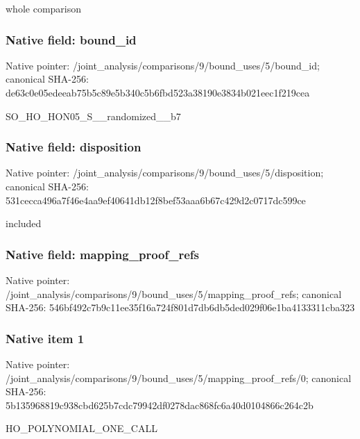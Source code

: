 \documentclass[10pt,a4paper]{article}
\begin{document}
\begingroup\raggedright\sloppy whole comparison\par\endgroup

\subsubsection{Native field: bound\_\allowbreak{}id}
Native pointer: /joint\_\allowbreak{}analysis/comparisons/9/bound\_\allowbreak{}uses/5/bound\_\allowbreak{}id; canonical SHA-256: de63c0e05edeeab75b5c89e5b340c5b6fbd523a38190e3834b021eec1f219cea

\begingroup\raggedright\sloppy SO\_\allowbreak{}HO\_\allowbreak{}HON05\_\allowbreak{}S\_\allowbreak{}\_\allowbreak{}randomized\_\allowbreak{}\_\allowbreak{}b7\par\endgroup

\subsubsection{Native field: disposition}
Native pointer: /joint\_\allowbreak{}analysis/comparisons/9/bound\_\allowbreak{}uses/5/disposition; canonical SHA-256: 531cecca496a7f46e4aa9ef40641db12f8bef53aaa6b67c429d2c0717dc599ce

\begingroup\raggedright\sloppy included\par\endgroup

\subsubsection{Native field: mapping\_\allowbreak{}proof\_\allowbreak{}refs}
Native pointer: /joint\_\allowbreak{}analysis/comparisons/9/bound\_\allowbreak{}uses/5/mapping\_\allowbreak{}proof\_\allowbreak{}refs; canonical SHA-256: 546bf492c7b9c11ee35f16a724f801d7db6db5ded029f06e1ba4133311cba323

\subsubsection{Native item 1}
Native pointer: /joint\_\allowbreak{}analysis/comparisons/9/bound\_\allowbreak{}uses/5/mapping\_\allowbreak{}proof\_\allowbreak{}refs/0; canonical SHA-256: 5b135968819c938cbd625b7cdc79942df0278dac868fc6a40d0104866c264c2b

\begingroup\raggedright\sloppy HO\_\allowbreak{}POLYNOMIAL\_\allowbreak{}ONE\_\allowbreak{}CALL\par\endgroup
\end{document}
